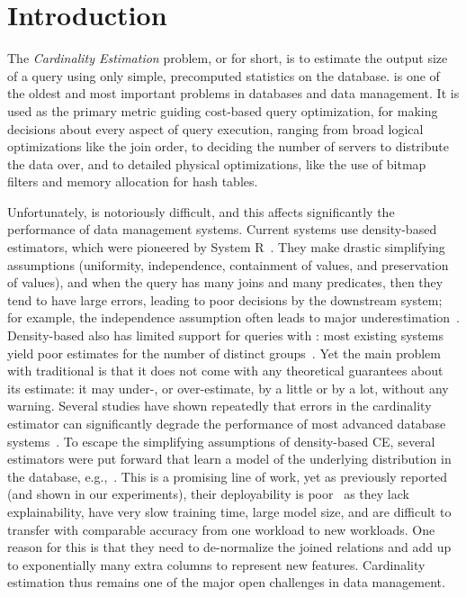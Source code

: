 \section{Introduction}
\label{sec:intro}

The \emph{Cardinality Estimation} problem, or \ce for short, is 
to estimate the output size of a query using only simple, precomputed
statistics on the database. \ce is one of the oldest and most
important problems in databases and data management.  It is used as the
primary metric guiding cost-based query optimization, for making
decisions about every aspect of query execution, ranging from broad
logical optimizations like the join order, to deciding the number of
servers to distribute the data over, and to detailed physical
optimizations, like the use of bitmap filters and memory allocation
for hash tables.

Unfortunately, \ce is notoriously difficult, and this affects
significantly the performance of data management systems.  Current
systems use density-based estimators, which were pioneered by System
R~\cite{DBLP:conf/sigmod/SelingerACLP79}.  They make drastic
simplifying assumptions (uniformity, independence, containment of
values, and preservation of values), and when the query has many joins
and many predicates, then they tend to have large errors, leading to
poor decisions by the downstream system; for example, the independence
assumption often leads to major
underestimation~\cite{DBLP:journals/pvldb/LeisGMBK015}.  Density-based
\ce also has limited support for queries with \groupby: most existing
systems yield poor estimates for the number of distinct
groups~\cite{DBLP:conf/cidr/Freitag019}. Yet the main problem with
traditional \ce is that it does not come with any theoretical
guarantees about its estimate: it may under-, or over-estimate, by a
little or by a lot, without any warning.  Several studies have shown
repeatedly that errors in the cardinality estimator can significantly
degrade the performance of most advanced database
systems~\cite{DBLP:journals/pvldb/LeisGMBK015,DBLP:journals/pvldb/LeeDNC23}.
To escape the simplifying assumptions of density-based CE, several
estimators were put forward that learn a model of the underlying
distribution in the database,
e.g.,~\cite{deepdb,bayescard,neurocard,flat}. This is a promising line
of work, yet as previously reported (and shown in our
experiments), their deployability is poor~\cite{FactorJoin:SIGMOD23} as
they lack explainability, have very slow training time, large model
size, and are difficult to transfer with comparable accuracy from one
workload to new workloads. One reason for this is that they need to
de-normalize the joined relations and add up to exponentially many
extra columns to represent new features.  Cardinality estimation
thus remains one of the major open challenges in data management.

